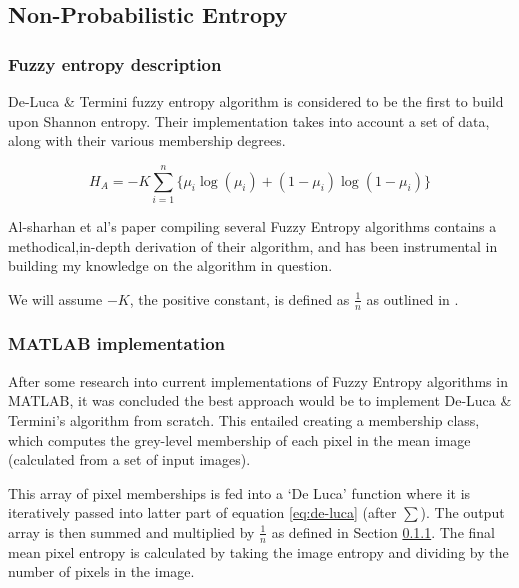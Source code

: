 \subsection{Non-Probabilistic Entropy}

\subsubsection{Fuzzy entropy description}
\label{sssec:desc}

De-Luca \& Termini fuzzy entropy algorithm \cite{DeLuca_Termini_1972} is considered to be the first to build upon Shannon entropy. Their implementation takes into account a set of data, along with their various membership degrees.


\begin{equation}
  \label{eq:de-luca}
  H_A = -K \displaystyle\sum_{i=1}^{n}{\{\mu_i\log(\mu_i) + (1 - \mu_i)\log(1 - \mu_i)\}}
\end{equation}

Al-sharhan et al's paper compiling several Fuzzy Entropy algorithms \cite{Al-Sharhan_Karray_Gueaieb_Basir_2001} contains a methodical,in-depth derivation of their algorithm, and has been instrumental in building my knowledge on the algorithm in question.

We will assume $-K$, the positive constant, is defined as $\frac{1}{n}$ as outlined in \cite{DeLuca_Termini_1972}.

\subsubsection{MATLAB implementation}

After some research into current implementations of Fuzzy Entropy algorithms in MATLAB, it was concluded the best approach would be to implement De-Luca \& Termini's algorithm from scratch. This entailed creating a membership class, which computes the grey-level membership of each pixel in the mean image (calculated from a set of input images).

This array of pixel memberships is fed into a `De Luca' function where it is iteratively passed into latter part of equation \ref{eq:de-luca} (after $\displaystyle\sum$). The output array is then summed and multiplied by $\frac{1}{n}$ as defined in Section \ref{sssec:desc}. The final mean pixel entropy is calculated by taking the image entropy and dividing by the number of pixels in the image.

